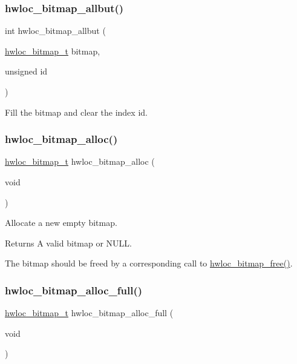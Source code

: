 \subsubsection{\texorpdfstring{hwloc\+\_\+bitmap\+\_\+allbut()}{hwloc\_bitmap\_allbut()}}
{\footnotesize\ttfamily int hwloc\+\_\+bitmap\+\_\+allbut (\begin{DoxyParamCaption}\item[{\hyperlink{a00205_gaa3c2bf4c776d603dcebbb61b0c923d84}{hwloc\+\_\+bitmap\+\_\+t}}]{bitmap,  }\item[{unsigned}]{id }\end{DoxyParamCaption})}



Fill the bitmap {\ttfamily and} clear the index {\ttfamily id}. 

\mbox{\label{a00205_gadece3d1eb5199fc2fb99bc7dcf1ccc05}} 
\subsubsection{\texorpdfstring{hwloc\+\_\+bitmap\+\_\+alloc()}{hwloc\_bitmap\_alloc()}}
{\footnotesize\ttfamily \hyperlink{a00205_gaa3c2bf4c776d603dcebbb61b0c923d84}{hwloc\+\_\+bitmap\+\_\+t} hwloc\+\_\+bitmap\+\_\+alloc (\begin{DoxyParamCaption}\item[{void}]{ }\end{DoxyParamCaption})}



Allocate a new empty bitmap. 

\begin{DoxyReturn}{Returns}
A valid bitmap or {\ttfamily N\+U\+LL}.
\end{DoxyReturn}
The bitmap should be freed by a corresponding call to \hyperlink{a00205_ga156130d85b3a0674d6e0e6770fe68fbe}{hwloc\+\_\+bitmap\+\_\+free()}. \mbox{\label{a00205_ga02853b4a224970587b9d7a0e20d857c0}} 
\subsubsection{\texorpdfstring{hwloc\+\_\+bitmap\+\_\+alloc\+\_\+full()}{hwloc\_bitmap\_alloc\_full()}}
{\footnotesize\ttfamily \hyperlink{a00205_gaa3c2bf4c776d603dcebbb61b0c923d84}{hwloc\+\_\+bitmap\+\_\+t} hwloc\+\_\+bitmap\+\_\+alloc\+\_\+full (\begin{DoxyParamCaption}\item[{void}]{ }\end{DoxyParamCaption})}



